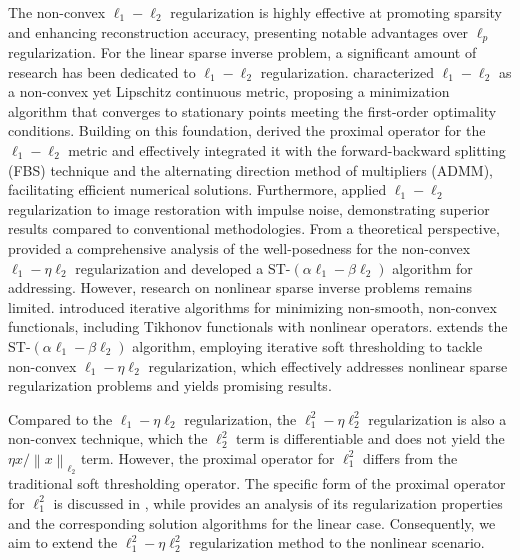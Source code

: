 \documentclass[a4paper,12pt]{article}
\numberwithin{equation}{section}
\begin{document}
\par The non-convex $\ell_{1}-\ell_{2}$ regularization is highly effective at promoting sparsity and enhancing reconstruction accuracy, presenting notable advantages over $\ell_{p}$ regularization. For the linear sparse inverse problem, a significant amount of research has been dedicated to $\ell_{1}-\ell_{2}$ regularization. \cite{YL15} characterized $\ell_{1}-\ell_{2}$ as a non-convex yet Lipschitz continuous metric, proposing a minimization algorithm that converges to stationary points meeting the first-order optimality conditions. Building on this foundation, \cite{LY18} derived the proximal operator for the $\ell_{1}-\ell_{2}$ metric and effectively integrated it with the forward-backward splitting (FBS) technique and the alternating direction method of multipliers (ADMM), facilitating efficient numerical solutions. Furthermore, \cite{LNN20} applied $\ell_{1}-\ell_{2}$ regularization to image restoration with impulse noise, demonstrating superior results compared to conventional methodologies. From a theoretical perspective, \cite{DH19} provided a comprehensive analysis of the well-posedness for the non-convex $\ell_{1}-\eta\ell_{2}$ regularization and developed a ST-$\left(\alpha\ell_{1}-\beta\ell_{2}\right)$ algorithm for addressing. However, research on nonlinear sparse inverse problems remains limited. \cite{BLR15} introduced iterative algorithms for minimizing non-smooth, non-convex functionals, including Tikhonov functionals with nonlinear operators. \cite{DH24} extends the ST-$\left(\alpha\ell_{1}-\beta\ell_{2}\right)$ algorithm, employing iterative soft thresholding to tackle non-convex $\ell_{1}-\eta\ell_{2}$ regularization, which effectively addresses nonlinear sparse regularization problems and yields promising results.

\par Compared to the $\ell_{1}-\eta\ell_{2}$ regularization, the $\ell_{1}^{2}-\eta\ell_{2}^{2}$ regularization is also a non-convex technique, which the $\ell_{2}^{2}$ term is differentiable and does not yield the $\eta x/\left\|x\right\|_{\ell_{2}}$ term. However, the proximal operator for $\ell_{1}^{2}$ differs from the traditional soft thresholding operator. The specific form of the proximal operator for $\ell_{1}^{2}$ is discussed in \cite{B17}, while \cite{LD25} provides an analysis of its regularization properties and the corresponding solution algorithms for the linear case. Consequently, we aim to extend the $\ell_{1}^{2}-\eta\ell_{2}^{2}$ regularization method to the nonlinear scenario.
\end{document}
